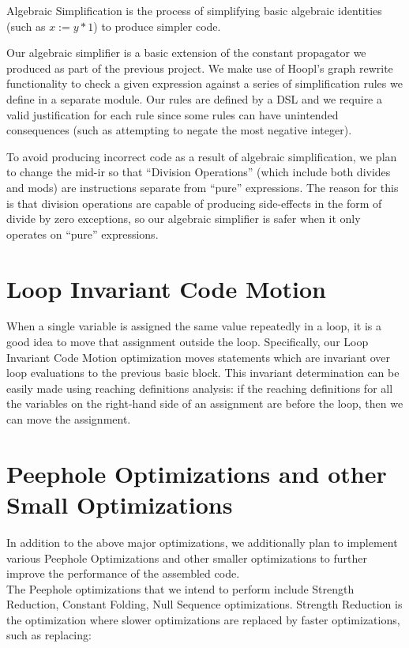 \documentclass[11pt]{article}
\begin{document}
Algebraic Simplification is the process of simplifying basic algebraic
identities (such as $x := y * 1$) to
produce simpler code. 

Our algebraic simplifier is a basic extension of the constant
propagator we produced as part of the previous project. We make use of
Hoopl's graph rewrite functionality to check a given expression
against a series of simplification rules we define in a separate
module. Our rules are defined by a DSL and we require a valid
justification for each rule since some rules can have unintended
consequences (such as attempting to negate the most negative
integer). 

To avoid producing incorrect code as a result of algebraic
simplification, we plan to change the mid-ir so that ``Division
Operations'' (which include both divides and mods) are instructions
separate from ``pure'' expressions. The reason for this is that
division operations are capable of producing side-effects in the form
of divide by zero exceptions, so our algebraic simplifier is safer
when it only operates on ``pure'' expressions. 



\section {Loop Invariant Code Motion}
\label{sec:codehoist}

When a single variable is assigned the same value repeatedly in a
loop, it is a good idea to move that assignment outside the loop.
Specifically, our Loop Invariant Code Motion optimization moves
statements which are invariant over loop evaluations to the previous
basic block. This invariant determination can be easily made using
reaching definitions analysis: if the reaching definitions for all the
variables on the right-hand side of an assignment are before the loop,
then we can move the assignment. 

\section {Peephole Optimizations and other Small Optimizations}
\label{sec:peephole}
In addition to the above major optimizations, we additionally plan to
implement various Peephole Optimizations and other smaller
optimizations to further improve the performance of the assembled
code.\\

The Peephole optimizations that we intend to perform include Strength
Reduction, Constant Folding, Null Sequence optimizations. Strength
Reduction is the optimization where slower optimizations are replaced
by faster optimizations, such as replacing:\\
\end{document}
